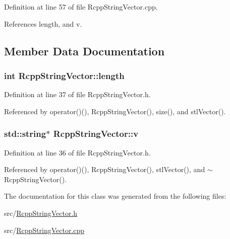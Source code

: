 Definition at line 57 of file RcppStringVector.cpp.

References length, and v.

\subsection{Member Data Documentation}
\hypertarget{classRcppStringVector_aaa2e2e4335d14e46fc96b07836e99573}{
\subsubsection[{length}]{\setlength{\rightskip}{0pt plus 5cm}int {\bf RcppStringVector::length}}}
\label{classRcppStringVector_aaa2e2e4335d14e46fc96b07836e99573}


Definition at line 37 of file RcppStringVector.h.

Referenced by operator()(), RcppStringVector(), size(), and stlVector().\hypertarget{classRcppStringVector_a94d14fa5093cc8219cbcb91aadfed09e}{
\subsubsection[{v}]{\setlength{\rightskip}{0pt plus 5cm}std::string$\ast$ {\bf RcppStringVector::v}}}
\label{classRcppStringVector_a94d14fa5093cc8219cbcb91aadfed09e}


Definition at line 36 of file RcppStringVector.h.

Referenced by operator()(), RcppStringVector(), stlVector(), and $\sim$RcppStringVector().

The documentation for this class was generated from the following files:\begin{DoxyCompactItemize}
\item 
src/\hyperlink{RcppStringVector_8h}{RcppStringVector.h}\item 
src/\hyperlink{RcppStringVector_8cpp}{RcppStringVector.cpp}\end{DoxyCompactItemize}
